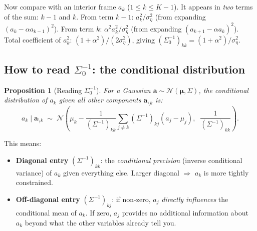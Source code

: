 \documentclass[11pt,a4paper]{article}
\newtheorem{proposition}[theorem]{Proposition}
\newcommand{\sigeta}{\sigma_\eta^2}
\begin{document}
Now compare with an interior frame $a_k$ ($1 \leq k \leq K-1$).  It appears in \emph{two} terms of the sum: $k-1$ and $k$.  From term $k-1$: $a_k^2/\sigeta$ (from expanding $(a_k - \alpha a_{k-1})^2$).  From term $k$: $\alpha^2 a_k^2/\sigeta$ (from expanding $(a_{k+1} - \alpha a_k)^2$).  Total coefficient of $a_k^2$: $(1+\alpha^2)/(2\sigeta)$, giving $(\Sigma_0^{-1})_{kk} = (1+\alpha^2)/\sigeta$.

\subsection{How to read $\Sigma_0^{-1}$: the conditional distribution}

\begin{proposition}[Reading $\Sigma_0^{-1}$]
For a Gaussian $\mathbf{a} \sim \mathcal{N}(\bm{\mu}, \Sigma)$, the conditional distribution of $a_k$ given all other components $\mathbf{a}_{\setminus k}$ is:
\begin{equation}\label{eq:conditional-from-precision}
  a_k \mid \mathbf{a}_{\setminus k} \;\sim\; \mathcal{N}\!\left(\mu_k - \frac{1}{(\Sigma^{-1})_{kk}}\sum_{j \neq k} (\Sigma^{-1})_{kj}(a_j - \mu_j),\;\; \frac{1}{(\Sigma^{-1})_{kk}}\right).
\end{equation}
\end{proposition}

This means:
\begin{itemize}[nosep]
  \item \textbf{Diagonal entry} $(\Sigma^{-1})_{kk}$: the \emph{conditional precision} (inverse conditional variance) of $a_k$ given everything else.  Larger diagonal $\Rightarrow$ $a_k$ is more tightly constrained.
  \item \textbf{Off-diagonal entry} $(\Sigma^{-1})_{kj}$: if non-zero, $a_j$ \emph{directly influences} the conditional mean of $a_k$.  If zero, $a_j$ provides no additional information about $a_k$ beyond what the other variables already tell you.
\end{itemize}
\end{document}
